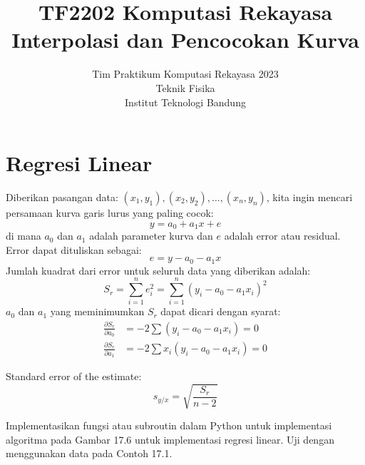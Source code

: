 



\title{%
{\small TF2202 Komputasi Rekayasa}\\
Interpolasi dan Pencocokan Kurva
}
\author{Tim Praktikum Komputasi Rekayasa 2023\\
Teknik Fisika\\
Institut Teknologi Bandung}
\date{}
\maketitle







\section{Regresi Linear}
Diberikan pasangan data: $(x_1, y_1), (x_2, y_2), \ldots, (x_n, y_n)$, kita ingin
mencari persamaan kurva garis lurus yang paling cocok:
\begin{equation}
y = a_0 + a_1 x + e
\end{equation}
di mana $a_0$ dan $a_1$ adalah parameter kurva dan $e$ adalah error atau residual.
Error dapat dituliskan sebagai:
\begin{equation}
e = y - a_0 - a_1 x
\end{equation}
Jumlah kuadrat dari error untuk seluruh data yang diberikan adalah:
\begin{equation}
S_r = \sum_{i=1}^{n} e_{i}^2 = \sum_{i=1}^{n} \left( y_{i} - a_0 - a_1 x_{i} \right)^2
\end{equation}
$a_0$ dan $a_1$ yang meminimumkan $S_r$ dapat dicari dengan syarat:
\begin{align}
\frac{\partial S_r}{\partial a_0} & = -2 \sum \left( y_i - a_0 - a_1 x_i \right) = 0 \\
\frac{\partial S_r}{\partial a_1} & = -2 \sum x_{i} \left( y_i - a_0 - a_1 x_i \right) = 0
\end{align}



Standard error of the estimate:
\begin{equation}
s_{y/x} = \sqrt{\frac{S_r}{n - 2}}
\end{equation}


\begin{soal}
Implementasikan fungsi atau subroutin dalam Python untuk implementasi algoritma
pada Gambar 17.6 untuk implementasi regresi linear. Uji dengan menggunakan data
pada Contoh 17.1.
\end{soal}

